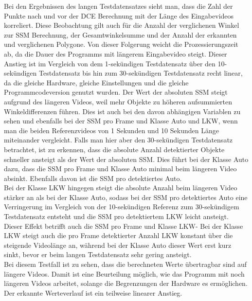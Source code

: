 {{		Bei den Ergebnissen des langen Testdatensatzes sieht man, dass die Zahl der Punkte nach und vor der DCE Berechnung mit der Länge des Eingabevideos korreliert. Diese Beobachtung gilt auch für die Anzahl der verglichenen Winkel zur SSM Berechnung, der Gesamtwinkelsumme und der Anzahl der erkannten und verglichenen Polygone. Von dieser Folgerung weicht die Prozessierungszeit ab, da die Dauer des Programms mit längerem Eingabevideo steigt. Dieser Anstieg ist im Vergleich von dem 1-sekündigen Testdatensatz über den 10-sekündigen Testdatensatz bis hin zum 30-sekündigen Testdatensatz recht linear, da die gleiche Hardware, gleiche Einstellungen und die gleiche Programmcodeversion genutzt wurden. 
		Der Wert der absoluten SSM steigt aufgrund des längeren Videos, weil mehr Objekte zu höheren aufsummierten Winkeldifferenzen führen. Dies ist auch bei den davon abhängigen Variablen zu sehen und ebenfalls bei der SSM pro Frame und Klasse Auto und LKW, wenn man die beiden Referenzvideos von 1 Sekunden und 10 Sekunden Länge miteinander vergleicht. Falls man hier aber den 30-sekündigen Testdatensatz betrachtet, ist zu erkennen, dass die absolute Anzahl detektierter Objekte schneller ansteigt als der Wert der absoluten SSM. Dies führt bei der Klasse Auto dazu, dass die SSM pro Frame und Klasse Auto minimal beim längeren Video absinkt. Ebenfalls davon ist die SSM pro detektiertes Auto. \\
		Bei der Klasse LKW hingegen steigt die absolute Anzahl beim längeren Video stärker an als bei der Klasse Auto, sodass bei der SSM pro detektiertes Auto eine Verringerung im Vergleich von der 10-sekündigen Referenz zum 30-sekündigem Testdatensatz entsteht und die SSM pro detektiertem LKW leicht ansteigt. Dieser Effekt betrifft auch die SSM pro Frame und Klasse LKW- Bei der Klasse LKW steigt auch die pro Frame detektierter Anzahl LKW konstant über die steigende Videolänge an, während bei der Klasse Auto dieser Wert erst kurz sinkt, bevor er beim langen Testdatensatz sehr gering ansteigt. \\
		Bei diesem Testfall ist zu sehen, dass die berechneten Werte übertragbar sind auf längere Videos. Damit ist eine Beurteilung möglich, wie das Programm mit noch längeren Videos arbeitet, solange die Begrenzungen der Hardware es ermöglichen. Der erkannte Werteverlauf ist ein teilweise linearer Anstieg. \\






	}
}
